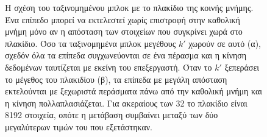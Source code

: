 \begin{figure}[H]
    \caption[Ταξινομημένο μπλοκ και πλακίδιο κοινής μνήμης]{Η σχέση του ταξινομημένου μπλοκ με το πλακίδιο της κοινής μνήμης. Ένα
    επίπεδο μπορεί να εκτελεστεί χωρίς επιστροφή στην καθολική μνήμη μόνο αν η
    απόσταση των στοιχείων που συγκρίνει χωρά στο πλακίδιο. Όσο τα ταξινομημένα
    μπλοκ μεγέθους $k'$ χωρούν σε αυτό (α), σχεδόν όλα τα επίπεδα συγχωνεύονται σε
    ένα πέρασμα και η κίνηση δεδομένων ταυτίζεται με εκείνη του επεξεργαστή. Όταν
    το $k'$ ξεπεράσει το μέγεθος του πλακιδίου (β), τα επίπεδα με μεγάλη απόσταση
    εκτελούνται με ξεχωριστά περάσματα πάνω από την καθολική μνήμη και η κίνηση
    πολλαπλασιάζεται. Για ακεραίους των 32  το πλακίδιο είναι 8192
    στοιχεία, οπότε η μετάβαση συμβαίνει μεταξύ των δύο μεγαλύτερων τιμών του
     που εξετάστηκαν.}
    \label{fig:gpu-tiling}
\end{figure}
